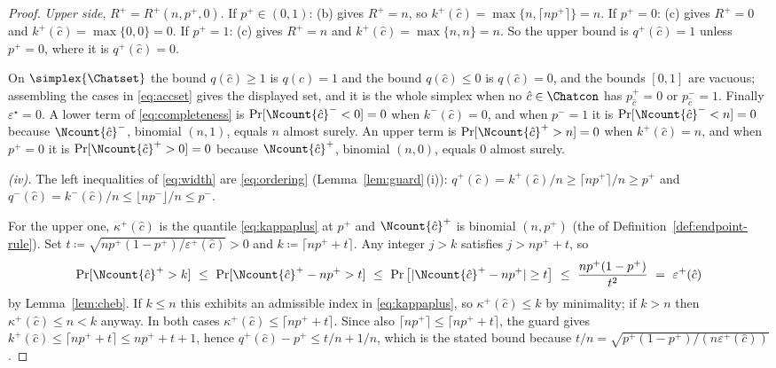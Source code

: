 \begin{proof}
\emph{Upper side}, $R^{+}=R^{+}(n,p^{+},0)$. If $p^{+}\in(0,1)$: (b) gives
$R^{+}=n$, so $k^{+}(\hat c)=\max\{n,\lceil np^{+}\rceil\}=n$. If $p^{+}=0$:
(c) gives $R^{+}=0$ and $k^{+}(\hat c)=\max\{0,0\}=0$. If $p^{+}=1$: (c) gives
$R^{+}=n$ and $k^{+}(\hat c)=\max\{n,n\}=n$. So the upper bound is
$q^{+}(\hat c)=1$ unless $p^{+}=0$, where it is $q^{+}(\hat c)=0$.

On $\simplex{\Chatset}$ the bound $q(\hat c)\ge1$ is $q(\hat c)=1$ and the
bound $q(\hat c)\le0$ is $q(\hat c)=0$, and the bounds $[0,1]$ are vacuous;
assembling the cases in \eqref{eq:accset} gives the displayed set, and it is
the whole simplex when no $\hat c\in\Chatcon$ has $p^{+}_{\hat c}=0$ or
$p^{-}_{\hat c}=1$. Finally $\varepsilon^{\star}=0$. A lower term of
\eqref{eq:completeness} is $\Pr[\Ncount{\hat c}^{-}<0]=0$ when
$k^{-}(\hat c)=0$, and when $p^{-}=1$ it is $\Pr[\Ncount{\hat c}^{-}<n]=0$
because $\Ncount{\hat c}^{-}$, binomial $(n,1)$, equals $n$ almost surely. An
upper term is $\Pr[\Ncount{\hat c}^{+}>n]=0$ when $k^{+}(\hat c)=n$, and when
$p^{+}=0$ it is $\Pr[\Ncount{\hat c}^{+}>0]=0$ because
$\Ncount{\hat c}^{+}$, binomial $(n,0)$, equals $0$ almost surely.

\emph{(iv).} The left inequalities of \eqref{eq:width} are \eqref{eq:ordering}
(Lemma~\ref{lem:guard}\,(i)):
$q^{+}(\hat c)=k^{+}(\hat c)/n\ge\lceil np^{+}\rceil/n\ge p^{+}$ and
$q^{-}(\hat c)=k^{-}(\hat c)/n\le\lfloor np^{-}\rfloor/n\le p^{-}$.

For the upper one, $\kappa^{+}(\hat c)$ is the quantile \eqref{eq:kappaplus}
at $p^{+}$ and $\Ncount{\hat c}^{+}$ is binomial $(n,p^{+})$ (the
 of Definition~\ref{def:endpoint-rule}). Set
$t\coloneqq\sqrt{np^{+}(1-p^{+})/\varepsilon^{+}(\hat c)}>0$ and
$k\coloneqq\lceil np^{+}+t\rceil$. Any integer $j>k$ satisfies $j>np^{+}+t$,
so
\begin{equation*}
  \Pr[\Ncount{\hat c}^{+}>k]\ \le\ \Pr[\Ncount{\hat c}^{+}-np^{+}>t]
  \ \le\ \Pr\big[|\Ncount{\hat c}^{+}-np^{+}|\ge t\big]
  \ \le\ \frac{np^{+}(1-p^{+})}{t^{2}}\ =\ \varepsilon^{+}(\hat c)
\end{equation*}
by Lemma~\ref{lem:cheb}. If $k\le n$ this exhibits an admissible index in
\eqref{eq:kappaplus}, so $\kappa^{+}(\hat c)\le k$ by minimality; if $k>n$
then $\kappa^{+}(\hat c)\le n<k$ anyway. In both cases
$\kappa^{+}(\hat c)\le\lceil np^{+}+t\rceil$. Since also
$\lceil np^{+}\rceil\le\lceil np^{+}+t\rceil$, the guard gives
$k^{+}(\hat c)\le\lceil np^{+}+t\rceil\le np^{+}+t+1$, hence
$q^{+}(\hat c)-p^{+}\le t/n+1/n$, which is the stated bound because
$t/n=\sqrt{p^{+}(1-p^{+})/(n\varepsilon^{+}(\hat c))}$.


\end{proof}
